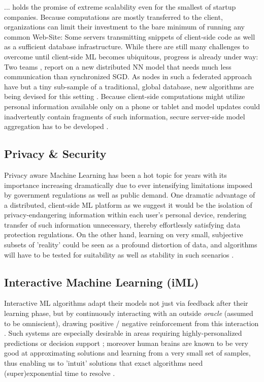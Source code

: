 \documentclass{llncs}
\begin{document}
... holds the promise of extreme scalability even for the smallest of startup companies. Because computations are mostly transferred to the client, organizations can limit their investment to the bare minimum of running any common Web-Site: Some servers transmitting snippets of client-side code as well as a sufficient database infrastructure. While there are still many challenges to overcome until client-side ML becomes ubiquitous, progress is already under way: Two teams \cite{mcmahan2016communication}, \cite{konevcny2016federatedlearning} report on a new distributed NN model that needs much less communication than synchronized SGD. As nodes in such a federated approach have but a tiny sub-sample of a traditional, global database, new algorithms are being devised for this setting \cite{konevcny2016federatedoptimization}. Because client-side computations might utilize personal information available only on a phone or tablet and model updates could inadvertently contain fragments of such information, secure server-side model aggregation has to be developed \cite{2017secureaggregation}.


\subsection{Privacy \& Security}
\label{ssect:privacy_security}

Privacy aware Machine Learning has been a hot topic for years \cite{wainwright2012paml} with its importance increasing dramatically due to ever intensifying limitations imposed by government regulations as well as public demand. One dramatic advantage of a distributed, client-side ML platform as we suggest it would be the isolation of privacy-endangering information within each user's personal device, rendering transfer of such information unnecessary, thereby effortlessly satisfying data protection regulations. On the other hand, learning on very small, subjective subsets of 'reality' could be seen as a profound distortion of data, and algorithms will have to be tested for suitability as well as stability in such scenarios \cite{malle2016right}.

\subsection{Interactive Machine Learning (iML)}
\label{ssect:iML}

Interactive ML algorithms adapt their models not just via feedback after their learning phase, but by continuously interacting with an outside \textit{oracle} (assumed to be omniscient), drawing positive / negative reinforcement from this interaction \cite{2016HolzingeriML}. Such systems are especially desirable in areas requiring highly-personalized predictions or decision support \cite{2016KiesebergDITL}; moreover human brains are known to be very good at approximating solutions and learning from a very small set of samples, thus enabling us to 'intuit' solutions that exact algorithms need (super)exponential time to resolve \cite{2016iMLExperiment}.
\end{document}
